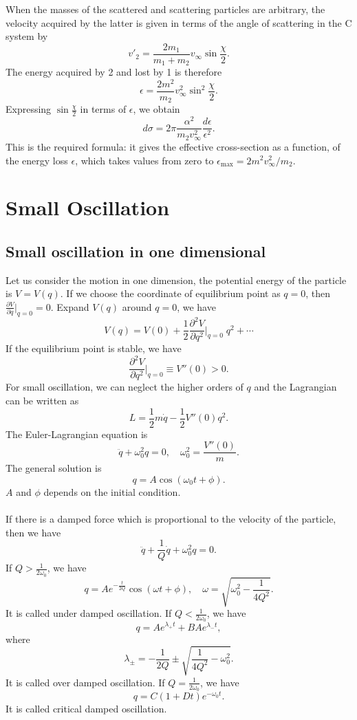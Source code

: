 When the masses of the scattered and scattering particles are arbitrary, the velocity acquired by the latter is given in terms of the angle of scattering in the C system by
\[v'_2 = \frac{2m_1}{m_1+m_2} v_{\infty} \sin \frac{\chi}{2}.\]
The energy acquired by 2 and lost by 1 is therefore
\[\epsilon = \frac{2m^2}{m_2} v_{\infty}^2 \sin^2 \frac{\chi}{2} .\]
Expressing $\sin \frac{\chi}{2}$ in terms of $\epsilon$, we obtain
\[d\sigma = 2\pi \frac{\alpha^2}{m_2 v^2_{\infty}} \frac{d\epsilon}{\epsilon^2}.\]
This is the required formula: it gives the effective cross-section as a function, of the energy loss $\epsilon$, which takes values from zero to $\epsilon_{\mathrm{max}} = 2m^2 v_{\infty}^2 /m_2$.

\chapter{Small Oscillation}
\section{Small oscillation in one dimensional}
Let us consider the motion in one dimension, the potential energy of the particle is $V = V(q)$. If we choose the coordinate of equilibrium point as $q=0$, then $ \frac{\partial V}{\partial q} |_{q=0} = 0$. Expand $V(q)$ around $q=0$, we have
\[V(q) = V(0) + \frac{1}{2}  \frac{\partial^2 V}{\partial q^2} |_{q=0} \; q^2 + \cdots  \]
If the equilibrium point is stable, we have
\[\frac{\partial^2 V}{\partial q^2} |_{q=0} \equiv V''(0) > 0.\]
For small oscillation, we can neglect the higher orders of $q$ and the Lagrangian can be written as
\[L = \frac{1}{2}m\dot{q} - \frac{1}{2}V''(0)q^2.\]
The Euler-Lagrangian equation is
\[\ddot{q} + \omega_0^2 q = 0 ,\quad \omega_0^2 = \frac{V''(0)}{m}.\]
The general solution is
\[q = A\cos(\omega_0 t + \phi).\]
$A$ and $\phi$ depends on the initial condition. 
\\ \\
If there is a damped force which is proportional to the velocity of the particle, then we have
\[\ddot{q} + \frac{1}{Q}\dot{q} + \omega_0^2 q = 0.\]
If $Q > \frac{1}{2\omega_0}$, we have
\[q = A e^{-\frac{t}{2Q}} \cos(\omega t + \phi) ,\quad \omega = \sqrt{\omega_0^2 - \frac{1}{4Q^2}}.\]
It is called under damped oscillation.
If $Q < \frac{1}{2\omega_0}$, we have
\[q = Ae^{\lambda_+ t} + B Ae^{\lambda_- t},\]
where
\[\lambda_{\pm} = -\frac{1}{2Q} \pm \sqrt{\frac{1}{4Q^2} - \omega_0^2 }.\]
It is called over damped oscillation.
If $Q = \frac{1}{2\omega_0}$, we have
\[q = C(1+Dt)e^{-\omega_0 t}.\]
It is called critical damped oscillation.

